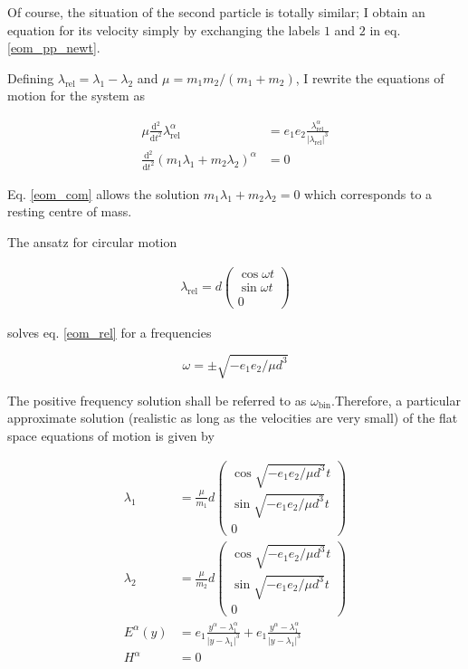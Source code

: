 \documentclass[11pt]{article}
\begin{document}
Of course, the situation of the second particle is totally similar; I obtain an equation for its velocity simply by exchanging the labels $1$ and $2$ in eq. \ref{eom_pp_newt}. 

Defining $\lambda_{\text{rel}} = \lambda_1 - \lambda_2$ and $\mu = m_1 m_2 / \left( m_1 + m_2 \right)$, I rewrite the equations of motion for the system as

\begin{align}
	\mu \frac{\mathrm{d}^2}{\mathrm{d}t^2} \lambda_{\text{rel}}^\alpha 
	&= e_1 e_2 \frac{\lambda_{\text{rel}}^\alpha}{\left| \lambda_{\text{rel}} \right|^3} \label{eom_rel}\\
	\frac{\mathrm{d}^2}{\mathrm{d}t^2} \left( m_1 \lambda_1 + m_2 \lambda_2 \right)^\alpha 
	&= 0 \label{eom_com}
\end{align}

Eq. \ref{eom_com} allows the solution $m_1 \lambda_1 + m_2 \lambda_2 = 0$ which corresponds to a resting centre of mass.

The ansatz for circular motion

\begin{align}
	\lambda_{\text{rel}}  
	= d\begin{pmatrix}
	\cos{\omega t}\\ \sin{\omega t}\\ 0
	\end{pmatrix}
\end{align}

solves eq. \ref{eom_rel} for a frequencies

 \begin{equation}
 	 \omega = \pm \sqrt{- e_1 e_2 / \mu d^3} \label{freq_bin}
 \end{equation}
 
The positive frequency solution shall be referred to as $\omega_{\text{bin}}$.Therefore, a particular approximate solution (realistic as long as the velocities are very small) of the flat space equations of motion is given by

\begin{align}
	\lambda_1 &= \frac{\mu}{m_1}
	d\begin{pmatrix}
	\cos{\sqrt{- e_1 e_2 / \mu d^3} t}\\ \sin{\sqrt{- e_1 e_2 / \mu d^3} t}\\ 0
	\end{pmatrix}\\
	\lambda_2 &= \frac{\mu}{m_2}
	d\begin{pmatrix}
	\cos{\sqrt{- e_1 e_2 / \mu d^3} t}\\ \sin{\sqrt{- e_1 e_2 / \mu d^3} t}\\ 0
	\end{pmatrix}\\
	E^\alpha \left( y \right) &= 
	e_1 \frac{y^\alpha - \lambda_1^\alpha }{\left| y - \lambda_1\right|^3} 
	+ e_1 \frac{y^\alpha - \lambda_1^\alpha }{\left| y - \lambda_1\right|^3} 
	\label{E_bin}\\
	H^\alpha &= 0 \label{H_bin}
\end{align}
\end{document}
